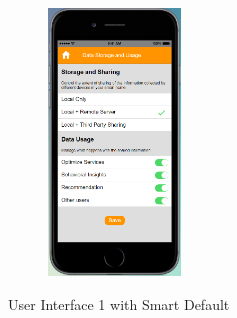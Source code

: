 \begin{figure}
\begin{subfigure}[t]{0.24\textwidth}
	\end{subfigure}%
	~
	\begin{subfigure}[t]{0.24\textwidth}
		\centering
		\includegraphics[height=2.8in]{figures/ui1sd4.png}
	\end{subfigure}%
	\caption{User Interface 1 with Smart Default}
	\label{fig:ui1OneR}
\end{figure}

